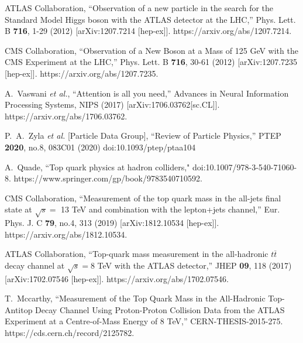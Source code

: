 \begin{thebibliography}{99}

ATLAS Collaboration,
``Observation of a new particle in the search for the Standard Model Higgs boson with the ATLAS detector at the LHC,''
Phys. Lett. B \textbf{716}, 1-29 (2012)
[arXiv:1207.7214 [hep-ex]].
https://arxiv.org/abs/1207.7214.

CMS Collaboration,
``Observation of a New Boson at a Mass of 125 GeV with the CMS Experiment at the LHC,''
Phys. Lett. B \textbf{716}, 30-61 (2012)
[arXiv:1207.7235 [hep-ex]].
https://arxiv.org/abs/1207.7235.

A.~Vaswani \textit{et al.},
``Attention is all you need,''
Advances in Neural Information Processing Systems, NIPS (2017)
[arXiv:1706.03762[sc.CL]].
https://arxiv.org/abs/1706.03762.

P.~A.~Zyla \textit{et al.} [Particle Data Group],
``Review of Particle Physics,''
PTEP \textbf{2020}, no.8, 083C01 (2020)
doi:10.1093/ptep/ptaa104

A.~Quade,
``Top quark physics at hadron colliders,"
doi:10.1007/978-3-540-71060-8.
https://www.springer.com/gp/book/9783540710592.

CMS Collaboration,
``Measurement of the top quark mass in the all-jets final state at $\sqrt{s} =$ 13 TeV and combination with the lepton+jets channel,''
Eur. Phys. J. C \textbf{79}, no.4, 313 (2019)
[arXiv:1812.10534 [hep-ex]].
https://arxiv.org/abs/1812.10534.

ATLAS Collaboration,
``Top-quark mass measurement in the all-hadronic $ t\overline{t} $ decay channel at $ \sqrt{s}=8 $ TeV with the ATLAS detector,''
JHEP \textbf{09}, 118 (2017)
[arXiv:1702.07546 [hep-ex]].
https://arxiv.org/abs/1702.07546.

T.~Mccarthy,
``Measurement of the Top Quark Mass in the All-Hadronic Top-Antitop Decay Channel Using Proton-Proton Collision Data from the ATLAS Experiment at a Centre-of-Mass Energy of 8 TeV,''
CERN-THESIS-2015-275.
https://cds.cern.ch/record/2125782.


\end{thebibliography}
